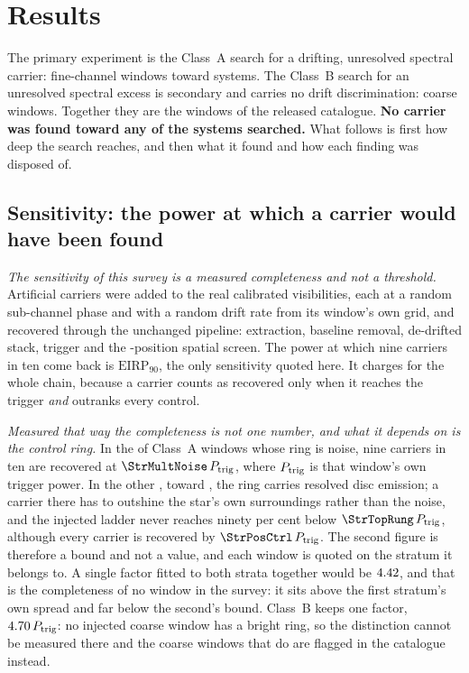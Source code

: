\section{Results}
\label{sec:results}

The primary experiment is the Class~A search for a drifting, unresolved
spectral carrier: \NWinA{} fine-channel windows toward \NSysClassA{}
systems. The Class~B search for an unresolved spectral excess is secondary
and carries no drift discrimination: \NWinB{} coarse windows. Together they
are the \NWindows{} windows of the released catalogue. \textbf{No carrier
was found toward any of the \NSystems{} systems searched.} What follows is
first how deep the search reaches, and then what it found and how each
finding was disposed of.

\subsection{Sensitivity: the power at which a carrier would have been
found} \label{sec:pninetysel}

\emph{The sensitivity of this survey is a measured completeness and not a
threshold.} Artificial carriers were added to the real calibrated
visibilities, each at a random sub-channel phase and with a random drift rate
from its window's own grid, and recovered through the unchanged pipeline:
extraction, baseline removal, de-drifted stack, trigger and the
\NCtrl-position spatial screen. The power at which nine carriers in ten come
back is $\mathrm{EIRP}_{90}$, the only sensitivity quoted here. It charges
for the whole chain, because a carrier counts as recovered only when it
reaches the trigger \emph{and} outranks every control.

\emph{Measured that way the completeness is not one number, and what it
depends on is the control ring.} In the \StrNNoiseWin{} of \NWinA{} Class~A
windows whose ring is noise, nine carriers in ten are recovered at
$\StrMultNoise\,P_{\rm trig}$, where $P_{\rm trig}$ is that window's own
trigger power. In the other \StrNDiscWin, toward \StrDiscStars,
the ring carries resolved disc emission; a carrier there has to outshine the
star's own surroundings rather than the noise, and the injected ladder never
reaches ninety per cent below $\StrTopRung\,P_{\rm trig}$, although every
carrier is recovered by $\StrPosCtrl\,P_{\rm trig}$. The second figure is
therefore a bound and not a value, and each window is quoted on the stratum
it belongs to. A single factor fitted to both strata together would be
$4.42$, and that is the completeness of no window in the survey:
it sits above the first stratum's own spread and far below the second's
bound. Class~B keeps one factor, $4.70\,P_{\rm trig}$: no
injected coarse window has a bright ring, so the distinction cannot be
measured there and the \StrNBrightB{} coarse windows that do are flagged in
the catalogue instead.

